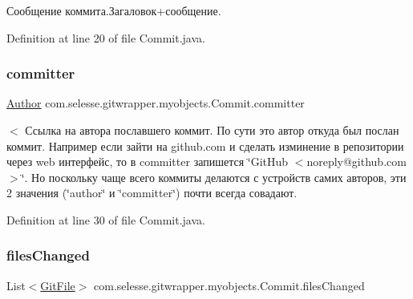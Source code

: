 Сообщение коммита.\+Загаловок+сообщение. 



Definition at line 20 of file Commit.\+java.

\mbox{\label{classcom_1_1selesse_1_1gitwrapper_1_1myobjects_1_1_commit_a1da6ac2512ea029bcb33054d18dcbf33}} 
\subsubsection{\texorpdfstring{committer}{committer}}
{\footnotesize\ttfamily \hyperlink{classcom_1_1selesse_1_1gitwrapper_1_1myobjects_1_1_author}{Author} com.\+selesse.\+gitwrapper.\+myobjects.\+Commit.\+committer\hspace{0.3cm}{\ttfamily [private]}}

$<$ Ссылка на автора пославшего коммит. По сути это автор откуда был послан коммит. Например если зайти на github.\+com и сделать изминение в репозитории через web интерфейс, то в committer запишется \char`\"{}\+Git\+Hub $<$noreply@github.\+com$>$\char`\"{}. Но поскольку чаще всего коммиты делаются с устройств самих авторов, эти 2 значения (\char`\"{}author\char`\"{} и \char`\"{}committer\char`\"{}) почти всегда совадают. 

Definition at line 30 of file Commit.\+java.

\mbox{\label{classcom_1_1selesse_1_1gitwrapper_1_1myobjects_1_1_commit_a4e94c2e615e45c49cde7814aa2ecdd7e}} 
\subsubsection{\texorpdfstring{files\+Changed}{filesChanged}}
{\footnotesize\ttfamily List$<$\hyperlink{classcom_1_1selesse_1_1gitwrapper_1_1myobjects_1_1_git_file}{Git\+File}$>$ com.\+selesse.\+gitwrapper.\+myobjects.\+Commit.\+files\+Changed\hspace{0.3cm}{\ttfamily [private]}}



